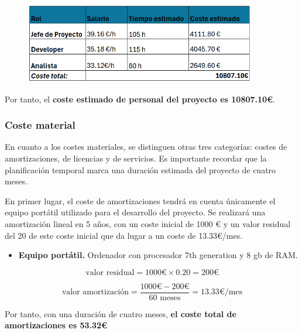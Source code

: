 \begin{figure}[H]
    \centering
    \includegraphics[width=0.90\textwidth]{tables/costeEstimcap.png}
    \label{table:costeEstimcap}
\end{figure}

Por tanto, el \textbf{coste estimado de personal del proyecto es 10807.10€}.

%


\subsubsection{Coste material}

En cuanto a los costes materiales, se distinguen otras tres categorías: costes de amortizaciones, de licencias y de servicios. Es importante recordar que la planificación temporal marca una duración estimada del proyecto de cuatro meses.

En primer lugar, el coste de amortizaciones tendrá en cuenta únicamente el equipo portátil utilizado para el desarrollo del proyecto. Se realizará una amortización lineal en 5 años, con un coste inicial de 1000 € y un valor residual del 20 de este coste inicial que da lugar a un coste de 13.33€/mes.

\begin{itemize}
    \item \textbf{Equipo portátil.} Ordenador con procesador 7th generation y 8 gb de RAM.
\end{itemize}

\begin{equation}
    \text{valor residual} = 1000 \text{€} \times 0.20 = 200 \text{€}
\end{equation}

\begin{equation}
    \text{valor amortización} = \frac{1000 \text{€} - 200 \text{€}}{60 \text{ meses}} = 13.33 \text{€/mes}
\end{equation}

Por tanto, con una duración de cuatro meses, \textbf{el coste total de amortizaciones es 53.32€}

